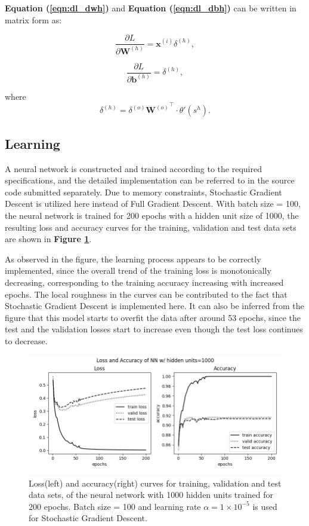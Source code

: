 \documentclass[12pt]{article}
\newcommand{\parder}[2] {
  \frac{\partial{#1} }{\partial{#2}}
}
\begin{document}
 \textbf{Equation (\ref{eqn:dl_dwh})} and \textbf{Equation (\ref{eqn:dl_dbh})} can be written in matrix form as:

\begin{equation}
\label{eqn:m_dl_dwh}
\parder{L}{\textbf{W}^{(h)}} = \textbf{x}^{(i)} \delta^{(h)},
\end{equation}

\begin{equation}
\label{eqn:m_dl_dbh}
\parder{L}{\textbf{b}^{(h)}} = \delta^{(h)},
\end{equation}

where
\begin{equation}
\label{eqn:m_delta_h}
\delta^{(h)} = \delta^{(o)} {\textbf{W}^{(o)}}^\intercal \cdot \theta'(s^{h}).
\end{equation}

\bigskip
\subsection{Learning}

A neural network is constructed and trained according to the required specifications, and the detailed implementation can be referred to in the source code submitted separately. Due to memory constraints, Stochastic Gradient Descent is utilized here instead of Full Gradient Descent.
With batch size = 100, the neural network is trained for 200 epochs with a hidden unit size of 1000, the resulting loss and accuracy curves for the training, validation and test data sets are shown in \textbf{Figure \ref{fig:1-3}}. 

As observed in the figure, the learning process appears to be correctly implemented, since the overall trend of the training loss is monotonically decreasing, corresponding to the training accuracy increasing with increased epochs. The local roughness in the curves can be contributed to the fact that Stochastic Gradient Descent is implemented here. It can also be inferred from the figure that this model starts to overfit the data after around 53 epochs, since the test and the validation losses start to increase even though the test loss continues to decrease.
\begin{figure}[!htb]
\includegraphics[width=0.95\linewidth]{images/a2/1.3/loss.png}
\caption{Loss(left) and accuracy(right) curves for training, validation and test data sets, of the neural network with 1000 hidden units trained for 200 epochs. Batch size = 100 and learning rate $\alpha = 1 \times 10^{-5}$ is used for Stochastic Gradient Descent.}  \label{fig:1-3}
\end{figure}
\end{document}
